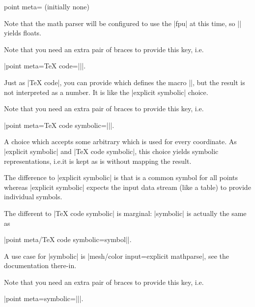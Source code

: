\begin{pgfplotskey}{point meta= (initially none)%
}
\begin{description}
            Note that the math parser will be configured to use the |fpu| at
            this time, so |\pgfmathparse| yields floats.

            Note that you need an extra pair of braces to provide this key,
            i.e.\@

            |point meta={TeX code=||}|.

        \item[\normalfont\declaretext{TeX code
            symbolic}\texttt{=}\meta{code}] Just as |TeX code|, you can
            provide  which defines the macro |\pgfplotspointmeta|,
            but the result is not interpreted as a number. It is like the
            |explicit symbolic| choice.

            Note that you need an extra pair of braces to provide this key,
            i.e.\@

            |point meta={TeX code symbolic=||}|.
        \item[\normalfont\declaretext{symbolic}\texttt{=}\meta{symbol}] A
            choice which accepts some arbitrary  which is used
            for every coordinate. As |explicit symbolic| and
            |TeX code symbolic|, this choice yields symbolic representations,
            i.e.\@ it is kept as is without mapping the result.

            The difference to |explicit symbolic| is that  is a
            common symbol for all points whereas |explicit symbolic| expects
            the input data stream (like a table) to provide individual
            symbols.

            The different to |TeX code symbolic| is marginal: |symbolic| is
            actually the same as

            |point meta/TeX code symbolic={\def\pgfplotspointmeta|\marg{symbol}|}|.

            A use case for |symbolic| is
            |mesh/color input=explicit mathparse|, see the documentation
            there-in.

            Note that you need an extra pair of braces to provide this key,
            i.e.\@

            |point meta={symbolic=||}|.
    \end{description}


\end{pgfplotskey}

